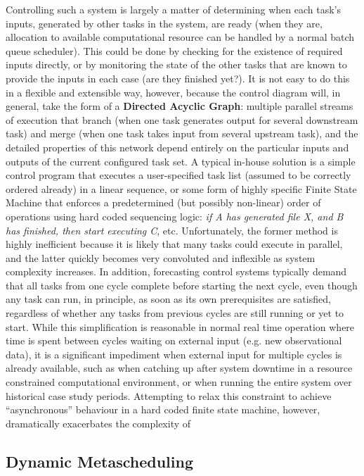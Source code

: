 \documentclass[11pt,a4paper]{article}
\begin{document}
Controlling such a system is largely a matter of determining when each
task's inputs, generated by other tasks in the system, are ready (when
they are, allocation to available computational resource can be handled
by a normal batch queue scheduler).  This could be done by checking for
the existence of required inputs directly, or by monitoring the state of
the other tasks that are known to provide the inputs in each case (are
they finished yet?). It is not easy to do this in a flexible and
extensible way, however, because the control diagram will, in general,
take the form of a \textbf{Directed Acyclic Graph}: multiple parallel
streams of execution that branch (when one task generates output for
several downstream task) and merge (when one task takes input from
several upstream task), and the detailed properties of this network
depend entirely on the particular inputs and outputs of the current
configured task set.  A typical in-house solution is a simple control
program that executes a user-specified task list (assumed to be
correctly ordered already) in a linear sequence, or some form of highly
specific Finite State Machine that enforces a predetermined (but
possibly non-linear) order of operations using hard coded sequencing
logic: {\em if A has generated file X, and B has finished, then start
executing C}, etc. Unfortunately, the former method is highly
inefficient because it is likely that many tasks could execute in
parallel, and the latter quickly becomes very convoluted and inflexible
as system complexity increases. In addition, forecasting control systems
typically demand that all tasks from one cycle complete before starting
the next cycle, even though any task can run, in principle, as soon as
its own prerequisites are satisfied, regardless of whether any tasks
from previous cycles are still running or yet to start.  While this
simplification is reasonable in normal real time operation where time is
spent between cycles waiting on external input (e.g. new observational
data), it is a significant impediment when external input for multiple
cycles is already available, such as when catching up after system
downtime in a resource constrained computational environment, or when
running the entire system over historical case study periods.
Attempting to relax this constraint to achieve ``asynchronous''
behaviour in a hard coded finite state machine, however, dramatically
exacerbates the complexity of 


\subsection{Dynamic Metascheduling}
\end{document}
